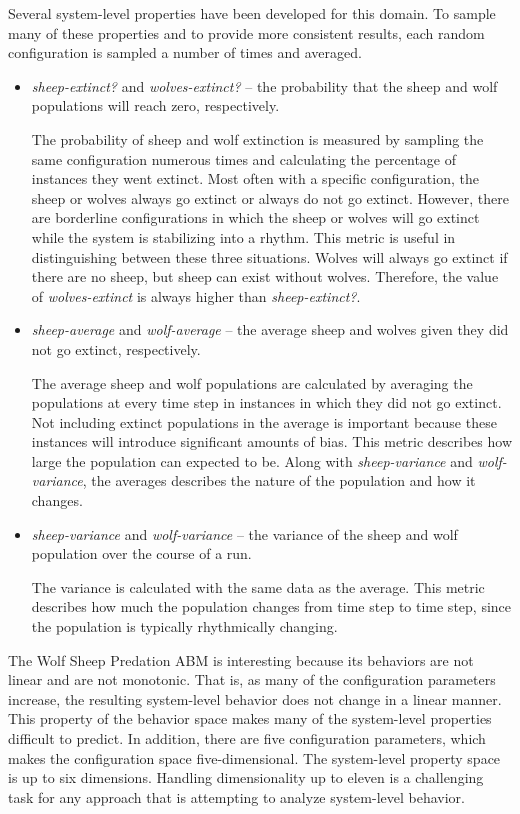 Several system-level properties have been developed for this domain.
To sample many of these properties and to provide more consistent results, each random configuration is sampled a number of times and averaged.
\begin{itemize}
\item \textit{sheep-extinct?} and \textit{wolves-extinct?} -- the probability that the sheep and wolf populations will reach zero, respectively.

The probability of sheep and wolf extinction is measured by sampling the same configuration numerous times and calculating the percentage of instances they went extinct.
Most often with a specific configuration, the sheep or wolves always go extinct or always do not go extinct.
However, there are borderline configurations in which the sheep or wolves will go extinct while the system is stabilizing into a rhythm.
This metric is useful in distinguishing between these three situations.
Wolves will always go extinct if there are no sheep, but sheep can exist without wolves.
Therefore, the value of \textit{wolves-extinct} is always higher than \textit{sheep-extinct?}.

\item \textit{sheep-average} and \textit{wolf-average} -- the average sheep and wolves given they did not go extinct, respectively.

The average sheep and wolf populations are calculated by averaging the populations at every time step in instances in which they did not go extinct.
Not including extinct populations in the average is important because these instances will introduce significant amounts of bias.
This metric describes how large the population can expected to be.
Along with \textit{sheep-variance} and \textit{wolf-variance}, the averages describes the nature of the population and how it changes.

\item \textit{sheep-variance} and \textit{wolf-variance} -- the variance of the sheep and wolf population over the course of a run.

The variance is calculated with the same data as the average.
This metric describes how much the population changes from time step to time step, since the population is typically rhythmically changing.

\end{itemize}

The Wolf Sheep Predation ABM is interesting because its behaviors are not linear and are not monotonic.
That is, as many of the configuration parameters increase, the resulting system-level behavior does not change in a linear manner.
This property of the behavior space makes many of the system-level properties difficult to predict.
In addition, there are five configuration parameters, which makes the configuration space five-dimensional.
The system-level property space is up to six dimensions.
Handling dimensionality up to eleven is a challenging task for any approach that is attempting to analyze system-level behavior.



